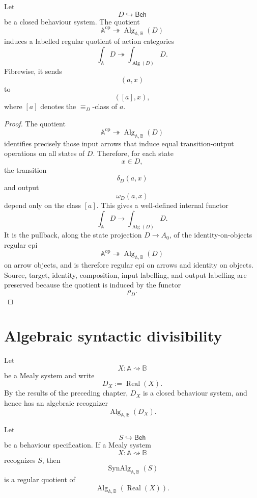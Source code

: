 \begin{proposition}
\label{prop:reiterman-state-to-algebraic-quotient}
Let
\[
D\hookrightarrow\mathsf{Beh}
\]
be a closed behaviour system. The quotient
\[
\mathbb A^{\mathrm{op}}
\twoheadrightarrow
\operatorname{Alg}_{\mathbb A,\mathbb B}(D)
\]
induces a labelled regular quotient of action categories
\[
\int_{\mathbb A}D
\twoheadrightarrow
\int_{\operatorname{Alg}(D)}D.
\]
Fibrewise, it sends
\[
(a,x)
\]
to
\[
([a],x),
\]
where \([a]\) denotes the \({\equiv_D}\)-class of \(a\).
\end{proposition}

\begin{proof}
The quotient
\[
\mathbb A^{\mathrm{op}}
\twoheadrightarrow
\operatorname{Alg}_{\mathbb A,\mathbb B}(D)
\]
identifies precisely those input arrows that induce equal transition-output
operations on all states of \(D\). Therefore, for each state
\[
x\in D,
\]
the transition
\[
\delta_D(a,x)
\]
and output
\[
\omega_D(a,x)
\]
depend only on the class \([a]\). This gives a well-defined internal functor
\[
\int_{\mathbb A}D
\to
\int_{\operatorname{Alg}(D)}D.
\]
It is the pullback, along the state projection \(D\to A_0\), of the
identity-on-objects regular epi
\[
\mathbb A^{\mathrm{op}}
\twoheadrightarrow
\operatorname{Alg}_{\mathbb A,\mathbb B}(D)
\]
on arrow objects, and is therefore regular epi on arrows and identity on
objects. Source, target, identity, composition, input labelling, and output
labelling are preserved because the quotient is induced by the functor
\[
\rho_D.
\]
\end{proof}

\section{Algebraic syntactic divisibility}
\label{sec:reiterman-algebraic-syntactic-divisibility}

Let
\[
X:\mathbb A\rightsquigarrow\mathbb B
\]
be a Mealy system and write
\[
D_X:=\operatorname{Real}(X).
\]
By the results of the preceding chapter, \(D_X\) is a closed behaviour system,
and hence has an algebraic recognizer
\[
\operatorname{Alg}_{\mathbb A,\mathbb B}(D_X).
\]

\begin{theorem}
\label{thm:reiterman-algebraic-syntactic-divisibility}
Let
\[
S\hookrightarrow\mathsf{Beh}
\]
be a behaviour specification. If a Mealy system
\[
X:\mathbb A\rightsquigarrow\mathbb B
\]
recognizes \(S\), then
\[
\operatorname{SynAlg}_{\mathbb A,\mathbb B}(S)
\]
is a regular quotient of
\[
\operatorname{Alg}_{\mathbb A,\mathbb B}(\operatorname{Real}(X)).
\]
\end{theorem}

